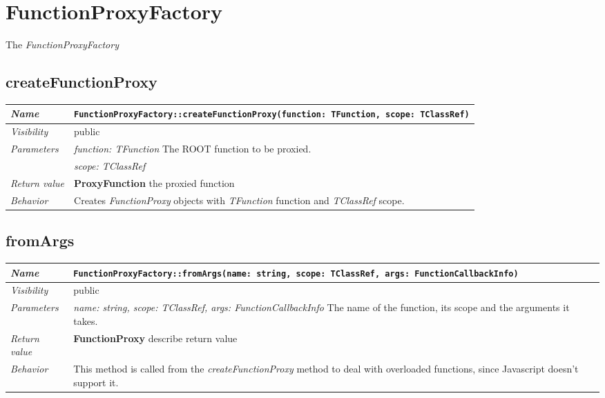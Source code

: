 \chapter{FunctionProxyFactory}
The \textit{FunctionProxyFactory} 
\section{createFunctionProxy}
\begin{longtable}{p{3cm} @{\hskip 1cm} p{12cm}}
 \hline
\textit{Name} & \texttt{FunctionProxyFactory::createFunctionProxy(function: TFunction, scope: TClassRef)}\\
\hline
 \textit{Visibility} & public\\
\hline
\textit{Parameters} & \textit{function: TFunction} The ROOT function to be proxied. \\ 
& \textit{scope: TClassRef}\\
\hline
\textit{Return value} & \textbf{ProxyFunction} the proxied function\\
  \hline
 \textit{Behavior} & Creates \textit{FunctionProxy} objects with \textit{TFunction} function and \textit{TClassRef} scope.\\
\hline
\end{longtable} \pagebreak
 \section{fromArgs}
\begin{longtable}{p{3cm} @{\hskip 1cm} p{12cm}}
 \hline	
\textit{Name} & \texttt{FunctionProxyFactory::fromArgs(name: string, scope: TClassRef, args: FunctionCallbackInfo)}\\
\hline
 \textit{Visibility} & public\\
\hline
\textit{Parameters} & \textit{name: string, scope: TClassRef, args: FunctionCallbackInfo} The name of the function, its scope and the arguments it takes.\\
\hline
\textit{Return value} & \textbf{ FunctionProxy} describe return value\\
  \hline
 \textit{Behavior} & This method is called from the \textit{createFunctionProxy} method to deal with overloaded functions, since Javascript doesn't support it.\\
\hline
\end{longtable} \pagebreak
